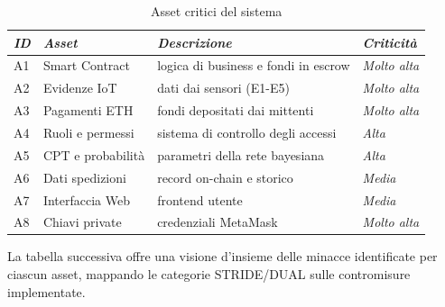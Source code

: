\begin{table}[H]
\centering
\caption{Asset critici del sistema}
\label{tab:asset-critici}
\begin{tabularx}{\textwidth}{l l L l}
\toprule
\textit{ID} & \textit{Asset} & \textit{Descrizione} & \textit{Criticità} \\
\midrule
A1 & Smart Contract & logica di business e fondi in escrow & \textit{Molto alta} \\
A2 & Evidenze IoT & dati dai sensori (E1-E5) & \textit{Molto alta} \\
A3 & Pagamenti ETH & fondi depositati dai mittenti & \textit{Molto alta} \\
A4 & Ruoli e permessi & sistema di controllo degli accessi & \textit{Alta} \\
A5 & CPT e probabilità & parametri della rete bayesiana & \textit{Alta} \\
A6 & Dati spedizioni & record on-chain e storico & \textit{Media} \\
A7 & Interfaccia Web & frontend utente & \textit{Media} \\
A8 & Chiavi private & credenziali MetaMask & \textit{Molto alta} \\
\bottomrule
\end{tabularx}
\end{table}

\vspace{1em}
La tabella successiva offre una visione d'insieme delle minacce identificate per ciascun asset, mappando le categorie STRIDE/DUAL sulle contromisure implementate.

\newcommand{\rotheader}[2]{%
    \rotatebox{90}{\parbox{3cm}{\raggedright \textcolor{white}{\textbf{#1}}\textcolor{white}{#2}}}}
\newcommand{\chk}{$\bullet$}

